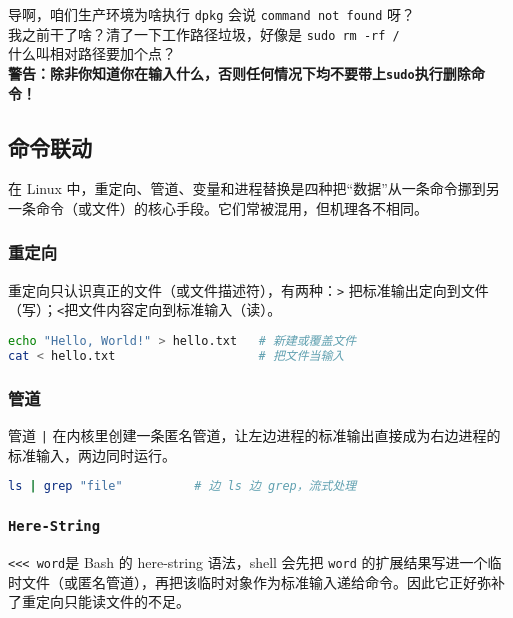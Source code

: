 \documentclass[../main.tex]{subfiles}
\begin{document}
\begin{warning}
  导啊，咱们生产环境为啥执行 \texttt{dpkg} 会说 \texttt{command not found} 呀？\\
  我之前干了啥？清了一下工作路径垃圾，好像是 \texttt{sudo rm -rf /}\\
  什么叫相对路径要加个点？\\
  {\color{red}\textbf{警告：除非你知道你在输入什么，否则任何情况下均不要带上\texttt{sudo}执行删除命令！}}
\end{warning}

\subsection{命令联动}

在 Linux 中，重定向、管道、变量和进程替换是四种把“数据”从一条命令挪到另一条命令（或文件）的核心手段。它们常被混用，但机理各不相同。

\subsubsection{重定向}

重定向只认识真正的文件（或文件描述符），有两种：\texttt{>} 把标准输出定向到文件（写）；\texttt{<}把文件内容定向到标准输入（读）。  
\begin{lstlisting}[language=bash]
echo "Hello, World!" > hello.txt   # 新建或覆盖文件
cat < hello.txt                    # 把文件当输入
\end{lstlisting}

\subsubsection{管道}

管道 \texttt{|} 在内核里创建一条匿名管道，让左边进程的标准输出直接成为右边进程的标准输入，两边同时运行。

\begin{lstlisting}[language=bash]
ls | grep "file"          # 边 ls 边 grep，流式处理
\end{lstlisting}

\subsubsection{\texttt{Here-String}}

\texttt{<<< word}是 Bash 的 here-string 语法，shell 会先把 \texttt{word} 的扩展结果写进一个临时文件（或匿名管道），再把该临时对象作为标准输入递给命令。因此它正好弥补了重定向只能读文件的不足。
\end{document}
